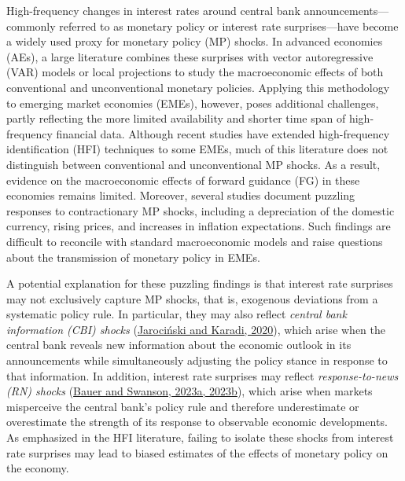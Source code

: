 \documentclass[12pt, reqno]{article}
\begin{document}
High-frequency changes in interest rates around central bank announcements—commonly referred to as monetary policy or interest rate surprises—have become a widely used proxy for monetary policy (MP) shocks. In advanced economies (AEs), a large literature combines these surprises with vector autoregressive (VAR) models or local projections to study the macroeconomic effects of both conventional and unconventional monetary policies. Applying this methodology to emerging market economies (EMEs), however, poses additional challenges, partly reflecting the more limited availability and shorter time span of high-frequency financial data. Although recent studies have extended high-frequency identification (HFI) techniques to some EMEs, much of this literature does not distinguish between conventional and unconventional MP shocks. As a result, evidence on the macroeconomic effects of forward guidance (FG) in these economies remains limited. Moreover, several studies document puzzling responses to contractionary MP shocks, including a depreciation of the domestic currency, rising prices, and increases in inflation expectations. Such findings are difficult to reconcile with standard macroeconomic models and raise questions about the transmission of monetary policy in EMEs.


A potential explanation for these puzzling findings is that interest rate surprises may not exclusively capture MP shocks, that is, exogenous deviations from a systematic policy rule. In particular, they may also reflect \emph{central bank information (CBI) shocks} (\hyperlink{JK (2020)}{Jarociński and Karadi, 2020}), which arise when the central bank reveals new information about the economic outlook in its announcements while simultaneously adjusting the policy stance in response to that information. In addition, interest rate surprises may reflect \emph{response-to-news (RN) shocks} (\hyperlink{Bauer and Swanson (2023a)}{Bauer and Swanson, 2023a, 2023b}), which arise when markets misperceive the central bank’s policy rule and therefore underestimate or overestimate the strength of its response to observable economic developments. As emphasized in the HFI literature, failing to isolate these shocks from interest rate surprises  may lead to biased estimates of the effects of monetary policy on the economy.
\end{document}
